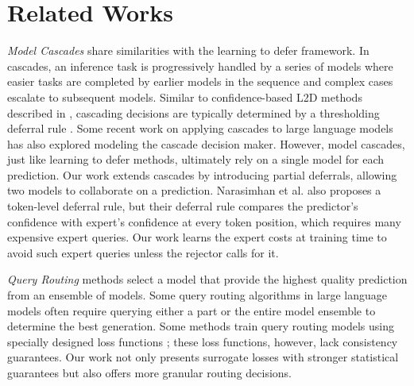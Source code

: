 \section{Related Works}
\label{sec:relworks}

\textit{Model Cascades} \cite{viola2001rapid} share similarities with the learning to defer framework. In cascades, an inference task is progressively handled by a series of models where easier tasks are completed by earlier models in the sequence and complex cases escalate to subsequent models. Similar to confidence-based L2D methods described in , cascading decisions are typically determined by a thresholding deferral rule \cite{yue2023large}. Some recent work on applying cascades to large language models \cite{gupta2024language,wang2024cascade} has also explored modeling the cascade decision maker. However, model cascades, just like learning to defer methods, ultimately rely on a single model for each prediction. Our work extends cascades by introducing partial deferrals, allowing two models to collaborate on a prediction. Narasimhan et al. \cite{narasimhan2024faster} also proposes a token-level deferral rule, but their deferral rule compares the predictor's confidence with expert's confidence at every token position, which requires many expensive expert queries. Our work learns the expert costs at training time to avoid such expert queries unless the rejector calls for it.

\textit{Query Routing} methods select a model that provide the highest quality prediction from an ensemble of models. Some query routing algorithms in large language models \cite{jiang2023llm,chen2023frugalgpt} often require querying either a part or the entire model ensemble to determine the best generation. Some methods train query routing models using specially designed loss functions \cite{shnitzer2023large,lu2023routing,ding2024hybrid}; these loss functions, however, lack consistency guarantees. Our work not only presents surrogate losses with stronger statistical guarantees but also offers more granular routing decisions.

